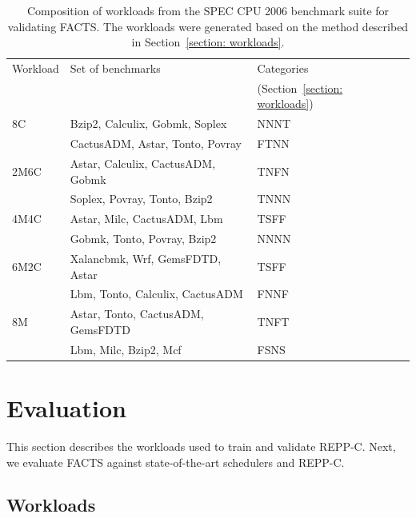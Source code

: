 \begin{table}[htbp]
    \centering
    \caption[FACTS workload composition]{ Composition of workloads from the SPEC CPU 2006 benchmark suite for validating FACTS. The workloads were generated based on the method described in Section~\ref{section: workloads}.}
    \begin{tabular}{@{}lllr@{}}
        \toprule
        Workload & Set of benchmarks & Categories \\
                 &                   & (Section~\ref{section: workloads})\\
        \midrule
        8C   & Bzip2, Calculix, Gobmk, Soplex    & NNNT \\
             & CactusADM, Astar, Tonto, Povray   & FTNN \\
        2M6C & Astar, Calculix, CactusADM, Gobmk & TNFN \\
             & Soplex, Povray, Tonto, Bzip2      & TNNN \\ 
        4M4C & Astar, Milc, CactusADM, Lbm       & TSFF \\ 
             & Gobmk, Tonto, Povray, Bzip2       & NNNN \\ 
        6M2C & Xalancbmk, Wrf, GemsFDTD, Astar   & TSFF \\
             & Lbm, Tonto, Calculix, CactusADM   & FNNF \\ 
        8M   & Astar, Tonto, CactusADM, GemsFDTD & TNFT \\
             & Lbm, Milc, Bzip2, Mcf             & FSNS \\ 
        \bottomrule
\end{tabular}
    \label{tab: factsworkload}
\end{table}

\vspace{2em}

\section{Evaluation} 
\label{sec: evaluationreppc}

This section describes the workloads used to train and validate REPP-C. Next, we evaluate
FACTS against state-of-the-art schedulers and REPP-C.

\subsection{Workloads} 
\label{subsec: reppc workloads} 

